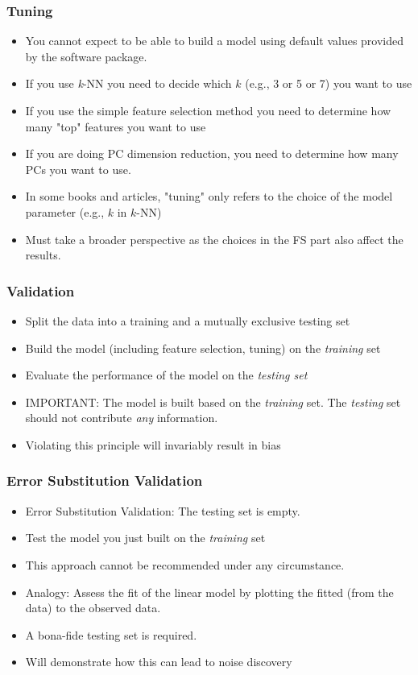\documentclass[xcolor=x11names,compress]{beamer}\usepackage[]{graphicx}\usepackage[]{color}
\begin{document}
\begin{frame}
  \frametitle{Tuning}
  \begin{itemize}
\item You cannot expect to be able to build a model using default values provided by the software
      package.
\item If you use {\it k}-NN you need to decide which $k$ (e.g., 3 or 5 or 7) you want to use
\item If you use the simple feature selection method you need to determine how many "top" features you want 
      to use
\item If you are doing PC dimension reduction, you need to determine how many PCs you want to use.
\item In some books and articles, "tuning" only refers to the choice of the model parameter (e.g., $k$ in $k$-NN)
\item Must take a broader perspective as the choices in the FS part also affect the results.
\end{itemize}
\end{frame}



\begin{frame}
  \frametitle{Validation}
  \begin{itemize}
\item Split the data into a training and a mutually exclusive testing
      set
\item Build the model (including feature selection, tuning) on the
      {\it training} set
\item Evaluate the performance of the model
      on the {\it testing set}
\item IMPORTANT: The model is built based on the {\it training}
      set. The {\it testing} set should not contribute {\it any}
      information.
\item Violating this principle will invariably result in bias
\end{itemize}
\end{frame}

\begin{frame}
  \frametitle{Error Substitution Validation}
  \begin{itemize}
\item Error Substitution Validation: The testing set is empty. 
\item Test the model you just built on the {\it training} set
\item This approach cannot be recommended under any circumstance.
\item Analogy: Assess the fit of the linear model by plotting the
      fitted (from the data) to the observed data.
\item A bona-fide testing set is required.
\item Will demonstrate how this can lead to noise discovery
\end{itemize}
\end{frame}
\end{document}
